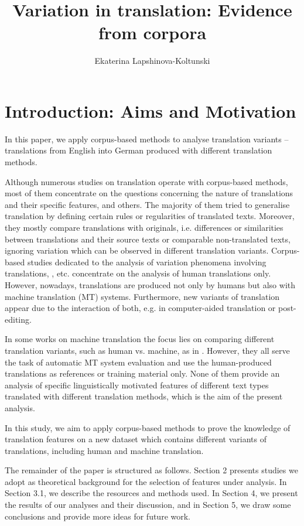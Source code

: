 \documentclass[output=paper]{LSP/langsci}
\author{Ekaterina Lapshinova-Koltunski}
\title{Variation in translation: Evidence from corpora}
\begin{document}
\section{Introduction: Aims and Motivation}

In this paper, we apply corpus-based methods to analyse translation variants – translations from English into German produced with different translation methods.

Although numerous studies on translation operate with corpus-based methods, most of them concentrate on the questions concerning the nature of translations and their specific features, \citep[see e.g.][]{Baker1993,Baker1995,Laviosa2002,Chesterman2004} and others. The majority of them tried to generalise translation by deﬁning certain rules or regularities of translated texts.  Moreover, they mostly compare translations with originals, i.e. differences or similarities between translations and their source texts or comparable non-translated texts, ignoring variation which can be observed in different translation variants. Corpus-based studies dedicated to the analysis of variation phenomena involving translations, \citep[e.g.][]{Teich2003,Steiner2004,Neumann2013}, etc. concentrate on the analysis of human translations only. However, nowadays, translations are produced not only by humans but also with machine translation (MT) systems. Furthermore, new variants of translation appear due to the interaction of both, e.g. in computer-aided translation or post-editing.

In some works on machine translation the focus lies on comparing different translation variants, such as human vs. machine, as in  \citep{White1994,Papineni2002,BabychHartley2004,Popovic2011}. However, they all serve the task of automatic MT system evaluation and use the human-produced translations as references or training material only. None of them provide an analysis of specific linguistically motivated features of different text types translated with different translation methods, which is the aim of the present analysis.

In this study, we aim to apply corpus-based methods to prove the knowledge of translation features on a new dataset which contains different variants of translations, including human and machine translation.

The remainder of the paper is structured as follows. Section 2 presents studies we adopt as theoretical background for the selection of features under analysis.  In Section 3.1, we describe the resources and methods used. In Section 4, we present the results of our analyses and their discussion, and in Section 5, we draw some conclusions and provide more ideas for future work.
\end{document}
